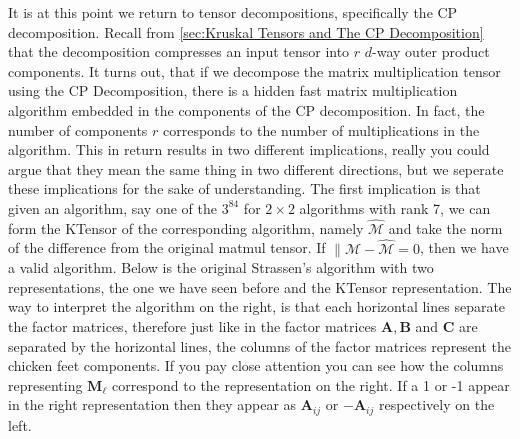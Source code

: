     It is at this point we return to tensor decompositions, specifically the CP
    decomposition. Recall from \ref{sec:Kruskal Tensors and The CP
    Decomposition} that the decomposition compresses an input tensor into $r$
    $d$-way outer product components. It turns out, that if we decompose the
    matrix multiplication tensor using the CP Decomposition, there is a hidden
    fast matrix multiplication algorithm embedded in the components of the CP
    decomposition. In fact, the number of components $r$ corresponds to the
    number of multiplications in the algorithm. This in return results in two
    different implications, really you could argue that they mean the same thing
    in two different directions, but we seperate these implications for the sake
    of understanding. The first implication is that given an algorithm, say one
    of the $3^84$ for $2\times 2$ algorithms with rank 7, we can form the
    KTensor of the corresponding algorithm, namely $\mathcal{\hat{M}}$ and take
    the norm of the difference from the original matmul tensor. If $\|\mathcal{M
    - \hat{M}} = 0$, then we have a valid algorithm. Below is the original
    Strassen's algorithm with two representations, the one we have seen before
    and the KTensor representation. The way to interpret the algorithm on the
    right, is that each horizontal lines separate the factor matrices, therefore
    just like in  the factor matrices $\mathbf{A}, \mathbf{B}$
    and $\mathbf{C}$ are separated by the horizontal lines, the columns of the
    factor matrices represent the chicken feet components. If you pay close
    attention you can see how the columns representing $\mathbf{M}_\ell$
    correspond to the representation on the right. If a 1 or -1 appear in the
    right representation then they appear as $\mathbf{A}_{ij}$ or
    $\mathbf{-A}_{ij}$ respectively on the left. 


